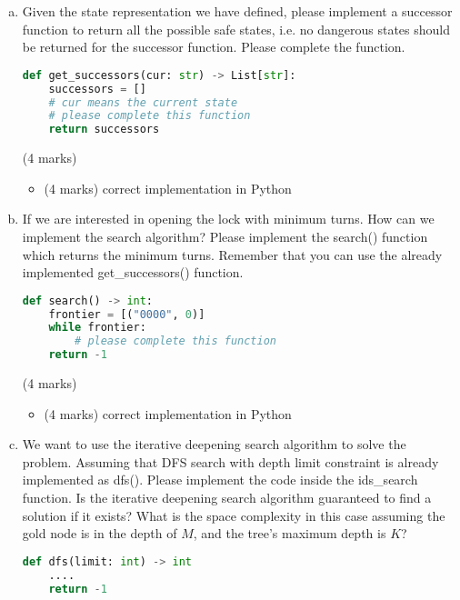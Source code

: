 \documentclass[12pt]{article}
\begin{document}
\begin{enumerate}[(a)]
    \item

          Given the state representation we have defined, please implement a successor function to return all the possible safe states, i.e. no dangerous states should be returned for the successor function. Please complete the function.
          \begin{lstlisting}[language=python]
def get_successors(cur: str) -> List[str]:
    successors = []
    # cur means the current state
    # please complete this function
    return successors 
\end{lstlisting}

          \begin{markscheme} (4 marks)
              \begin{itemize}
                  \item
                        (4 marks) correct implementation in Python
              \end{itemize}

          \end{markscheme}


    \item
          If we are interested in opening the lock with minimum turns. How can we implement the search algorithm? Please implement the search() function which returns the minimum turns. Remember that you can use the already implemented get\_successors() function.
          \begin{lstlisting}[language=python]
def search() -> int:
    frontier = [("0000", 0)]
    while frontier:
        # please complete this function
    return -1

\end{lstlisting}

          \begin{markscheme} (4 marks)
              \begin{itemize}
                  \item
                        (4 marks) correct implementation in Python
              \end{itemize}
          \end{markscheme}

    \item
          We want to use the iterative deepening search algorithm to solve the problem. Assuming that DFS search with depth limit constraint is already implemented as dfs(). Please implement the code inside the ids\_search function. Is the iterative deepening search algorithm guaranteed to find a solution if it exists? What is the space complexity in this case assuming the gold node is in the depth of $M$, and the tree's maximum depth is $K$?
          \begin{lstlisting}[language=python]
def dfs(limit: int) -> int
    ....
    return -1


\end{lstlisting}
\end{enumerate}
\end{document}
